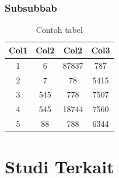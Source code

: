    \subsubsection{Subsubbab}

    \blindtext
	
	\begin{table}[h!]
		\centering
		\caption{Contoh tabel}
		\begin{tabular}{|c|c|c|c|} 
			\hline
			Col1 & Col2 & Col2 & Col3 \\
			\hline
			1 & 6 & 87837 & 787 \\ 
			\hline
			2 & 7 & 78 & 5415 \\
			\hline
			3 & 545 & 778 & 7507 \\
			\hline
			4 & 545 & 18744 & 7560 \\
			\hline
			5 & 88 & 788 & 6344 \\
			\hline
		\end{tabular}
		\label{table:1}
	\end{table}
	
\section{Studi Terkait}
\blindtext
